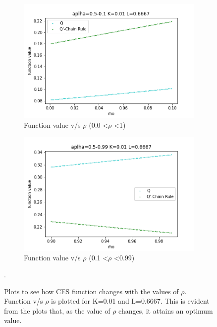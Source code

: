 \documentclass{article}
\begin{document}
\begin{figure}[H]
  \centering
  \begin{subfigure}{0.450\textwidth}
    \centering
    \includegraphics[width=\linewidth]{images/graphs/Q1_chain_0.001_0.1_alpha_0.5.png}
    \caption{Function value v/s $\rho$ (0.0 \textless $\rho$ \textless 1)}
 
  \end{subfigure}
  \begin{subfigure}{0.450\textwidth}
    \includegraphics[width=\linewidth]{images/graphs/Q1_chain_0.9_0.99_alpha_0.5.png}
\caption{Function value v/s $\rho$ (0.1 \textless $\rho$ \textless 0.99)}
    
  \end{subfigure}
  \caption{Plots to see how CES function changes with the values of $\rho$. Function v/s $\rho$ is plotted for K=0.01 and L=0.6667. This is evident from the plots that, as the value of $\rho$ changes, it attains an optimum value.}.
  \label{fig:test2}
  \end{figure}
\end{document}
